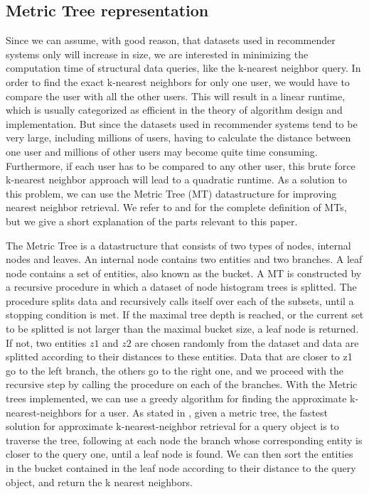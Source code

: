 \subsection{Metric Tree representation}
  Since we can assume, with good reason, that datasets used in recommender systems only will increase in size, we are interested in minimizing the computation time of structural data queries, like the k-nearest neighbor query. In order to find the exact k-nearest neighbors for only one user, we would have to compare the user with all the other users. This will result in a linear runtime, which is usually categorized as efficient in the theory of algorithm design and implementation. But since the datasets used in recommender systems tend to be very large, including millions of users, having to calculate the distance between one user and millions of other users may become quite time consuming. Furthermore, if each user has to be compared to any other user, this brute force k-nearest neighbor approach will lead to a quadratic runtime. As a solution to this problem, we can use the Metric Tree (MT) datastructure for improving nearest neighbor retrieval. We refer to \cite{jaeger2019counts} and \cite{uhlmann1991} for the complete definition of MTs, but we give a short explanation of the parts relevant to this paper.

  The Metric Tree is a datastructure that consists of two types of nodes, internal nodes and leaves. An internal node contains two entities and two branches. A leaf node contains a set of entities, also known as the bucket. A MT is constructed by a recursive procedure in which a dataset of node histogram trees is splitted. The procedure splits data and recursively calls itself over each of the subsets, until a stopping condition is met. If the maximal tree depth is reached, or the current set to be splitted is not larger than the maximal bucket size, a leaf node is returned. If not, two entities $z1$ and $z2$ are chosen randomly from the dataset and data are splitted according to their distances to these entities. Data that are closer to z1 go to the left branch, the others go to the right one, and we proceed with the recursive step by calling the procedure on each of the branches.
  With the Metric trees implemented, we can use a greedy algorithm for finding the approximate k-nearest-neighbors for a user.
  As stated in \cite{jaeger2019counts}, given a metric tree, the fastest solution for approximate k-nearest-neighbor retrieval for a query object is to traverse the tree, following at each node the branch whose corresponding entity is closer to the query one, until a leaf node is found. We can then sort the entities in the bucket contained in the leaf node according to their distance to the query object, and return the k nearest neighbors. 

